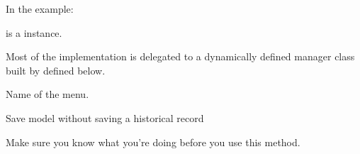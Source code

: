 \documentclass[letterpaper,10pt,english]{sphinxmanual}
\begin{document}
\begin{fulllineitems}
\begin{fulllineitems}
In the example:

\begin{sphinxVerbatim}[commandchars=\\\{\}]
 
       
\end{sphinxVerbatim}

 is a  instance.

Most of the implementation is delegated to a dynamically defined manager
class built by  defined below.

\end{fulllineitems}


\begin{fulllineitems}
\label{\detokenize{modules/models:gestion.models.Menu.name}}
Name of the menu.

\end{fulllineitems}


\begin{fulllineitems}
\label{\detokenize{modules/models:gestion.models.Menu.objects}}
\end{fulllineitems}


\begin{fulllineitems}
\label{\detokenize{modules/models:gestion.models.Menu.save_without_historical_record}}
Save model without saving a historical record

Make sure you know what you’re doing before you use this method.

\end{fulllineitems}


\end{fulllineitems}
\end{document}
